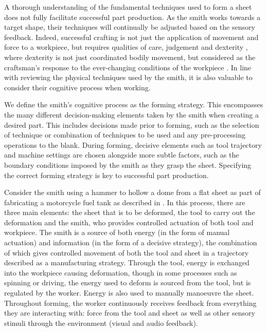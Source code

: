 A thorough understanding of the fundamental techniques used to form a sheet does not fully facilitate successful part production. As the smith works towards a target shape, their techniques will continually be adjusted based on the sensory feedback. Indeed, successful crafting is not just the application of movement and force to a workpiece, but requires qualities of care, judgement and dexterity \citep{Pye2008TheWorkmanship}, where dexterity is not just coordinated bodily movement, but considered as the craftsman's response to the ever-changing conditions of the workpiece \citep{Ingold2001BeyondSkill}. In line with reviewing the physical techniques used by the smith, it is also valuable to consider their cognitive process when working.

We define the smith’s cognitive process as the forming strategy. This encompasses the many different decision-making elements taken by the smith when creating a desired part. This includes decisions made prior to forming, such as the selection of technique or combination of techniques to be used and any pre-processing operations to the blank. During forming, decisive elements such as tool trajectory and machine settings are chosen alongside more subtle factors, such as the boundary conditions imposed by the smith as they grasp the sheet. Specifying the correct forming strategy is key to successful part production.  

Consider the smith using a hammer to hollow a dome from a flat sheet as part of fabricating a motorcycle fuel tank as described in \citep{Barr2013ProfessionalFabrication}. In this process, there are three main elements: the sheet that is to be deformed, the tool to carry out the deformation and the smith, who provides controlled actuation of both tool and workpiece. The smith is a source of both energy (in the form of manual actuation) and information (in the form of a decisive strategy), the combination of which gives controlled movement of both the tool and sheet in a trajectory described as a manufacturing strategy. Through the tool, energy is exchanged into the workpiece causing deformation, though in some processes such as spinning or driving, the energy used to deform is sourced from the tool, but is regulated by the worker. Energy is also used to manually manoeuvre the sheet. Throughout forming, the worker continuously receives feedback from everything they are interacting with: force from the tool and sheet as well as other sensory stimuli through the environment (visual and audio feedback). 

